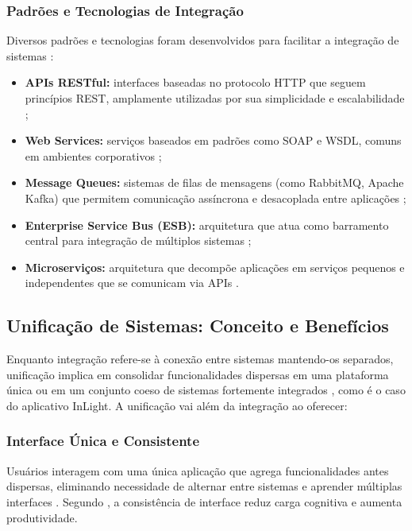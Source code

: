 \subsubsection{Padrões e Tecnologias de Integração}

Diversos padrões e tecnologias foram desenvolvidos para facilitar a integração de sistemas \cite{hohpe2003}:

\begin{itemize}
    \item \textbf{APIs RESTful:} interfaces baseadas no protocolo HTTP que seguem princípios REST, amplamente utilizadas por sua simplicidade e escalabilidade \cite{fielding2000};
    \item \textbf{Web Services:} serviços baseados em padrões como SOAP e WSDL, comuns em ambientes corporativos \cite{alonso2004};
    \item \textbf{Message Queues:} sistemas de filas de mensagens (como RabbitMQ, Apache Kafka) que permitem comunicação assíncrona e desacoplada entre aplicações \cite{snyder2011};
    \item \textbf{Enterprise Service Bus (ESB):} arquitetura que atua como barramento central para integração de múltiplos sistemas \cite{chappell2004};
    \item \textbf{Microserviços:} arquitetura que decompõe aplicações em serviços pequenos e independentes que se comunicam via APIs \cite{newman2015}.
\end{itemize}
\subsection{Unificação de Sistemas: Conceito e Benefícios}
Enquanto integração refere-se à conexão entre sistemas mantendo-os separados, unificação implica em consolidar funcionalidades dispersas em uma plataforma única ou em um conjunto coeso de sistemas fortemente integrados \cite{laudon2020}, como é o caso do aplicativo InLight. A unificação vai além da integração ao oferecer:
\subsubsection{Interface Única e Consistente}

Usuários interagem com uma única aplicação que agrega funcionalidades antes dispersas, eliminando necessidade de alternar entre sistemas e aprender múltiplas interfaces \cite{nielsen1993}. Segundo \cite{norman2013}, a consistência de interface reduz carga cognitiva e aumenta produtividade.

